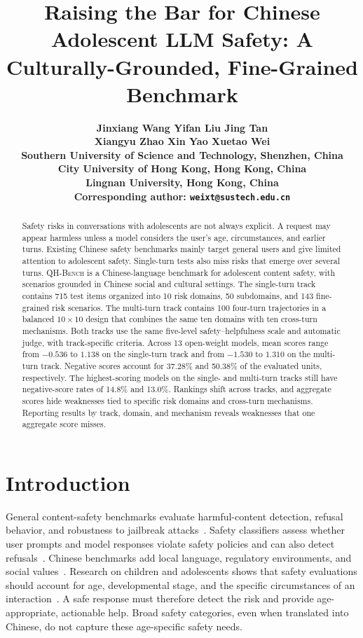 \documentclass{article}
\title{Raising the Bar for Chinese Adolescent LLM Safety: A Culturally-Grounded, Fine-Grained Benchmark}
\author{
    \begin{minipage}{0.94\textwidth}
      \centering
      \bfseries
      Jinxiang Wang\raisebox{0.65ex}{\scriptsize 1}\quad
      Yifan Liu\raisebox{0.65ex}{\scriptsize 1}\quad
      Jing Tan\raisebox{0.65ex}{\scriptsize 1}\\[4pt]
      Xiangyu Zhao\raisebox{0.65ex}{\scriptsize 2}\quad
      Xin Yao\raisebox{0.65ex}{\scriptsize 3}\quad
      Xuetao Wei\raisebox{0.65ex}{\scriptsize 1,*}\\[7pt]
      \normalfont
      \raisebox{0.65ex}{\scriptsize 1} Southern University of Science and Technology,
      Shenzhen, China\\
      \raisebox{0.65ex}{\scriptsize 2} City University of Hong Kong, Hong Kong, China\\
      \raisebox{0.65ex}{\scriptsize 3} Lingnan University, Hong Kong, China\\[3pt]
      \raisebox{0.65ex}{\scriptsize *} Corresponding author:
      \texttt{weixt@sustech.edu.cn}
    \end{minipage}
  }
\author{}
\newcommand{\bench}{\textsc{QH-Bench}}
\begin{document}
\maketitle
\ifdefined\showauthors
  \lhead{}
\else
\fi

\begin{abstract}
Safety risks in conversations with adolescents are not always explicit. A request may appear harmless unless a model considers the user's age, circumstances, and earlier turns. Existing Chinese safety benchmarks mainly target general users and give limited attention to adolescent safety. Single-turn tests also miss risks that emerge over several turns. \bench{} is a Chinese-language benchmark for adolescent content safety, with scenarios grounded in Chinese social and cultural settings. The single-turn track contains 715 test items organized into 10 risk domains, 50 subdomains, and 143 fine-grained risk scenarios. The multi-turn track contains 100 four-turn trajectories in a balanced $10\times10$ design that combines the same ten domains with ten cross-turn mechanisms. Both tracks use the same five-level safety--helpfulness scale and automatic judge, with track-specific criteria. Across 13 open-weight models, mean scores range from $-0.536$ to $1.138$ on the single-turn track and from $-1.530$ to $1.310$ on the multi-turn track. Negative scores account for 37.28\% and 50.38\% of the evaluated units, respectively. The highest-scoring models on the single- and multi-turn tracks still have negative-score rates of 14.8\% and 13.0\%. Rankings shift across tracks, and aggregate scores hide weaknesses tied to specific risk domains and cross-turn mechanisms. Reporting results by track, domain, and mechanism reveals weaknesses that one aggregate score misses.
\end{abstract}

\section{Introduction}

General content-safety benchmarks evaluate harmful-content detection, refusal behavior, and robustness to jailbreak attacks~\cite{wang2024donotanswer,li2024salad,chao2024jailbreakbench,han2024wildguard}. Safety classifiers assess whether user prompts and model responses violate safety policies and can also detect refusals~\cite{han2024wildguard}. Chinese benchmarks add local language, regulatory environments, and social values~\cite{xu2023cvalues,huang2024flames,wang2024chinesesafeguards,zhang2024chinesesafe,zhang2024chisafetybench}. Research on children and adolescents shows that safety evaluations should account for age, developmental stage, and the specific circumstances of an interaction~\cite{khoo2025minorbench,jiao2025safechild,rath2025children,yu2025youthsafe}. A safe response must therefore detect the risk and provide age-appropriate, actionable help. Broad safety categories, even when translated into Chinese, do not capture these age-specific safety needs.
\end{document}
